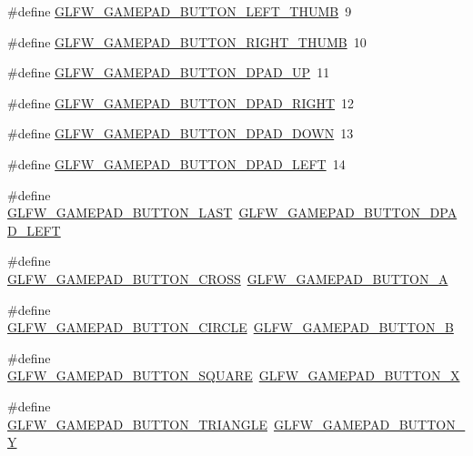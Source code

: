 \begin{DoxyCompactItemize}
\item 
\#define \mbox{\hyperlink{group__gamepad__buttons_ga3e089787327454f7bfca7364d6ca206a}{G\+L\+F\+W\+\_\+\+G\+A\+M\+E\+P\+A\+D\+\_\+\+B\+U\+T\+T\+O\+N\+\_\+\+L\+E\+F\+T\+\_\+\+T\+H\+U\+MB}}~9
\item 
\#define \mbox{\hyperlink{group__gamepad__buttons_ga1c003f52b5aebb45272475b48953b21a}{G\+L\+F\+W\+\_\+\+G\+A\+M\+E\+P\+A\+D\+\_\+\+B\+U\+T\+T\+O\+N\+\_\+\+R\+I\+G\+H\+T\+\_\+\+T\+H\+U\+MB}}~10
\item 
\#define \mbox{\hyperlink{group__gamepad__buttons_ga4f1ed6f974a47bc8930d4874a283476a}{G\+L\+F\+W\+\_\+\+G\+A\+M\+E\+P\+A\+D\+\_\+\+B\+U\+T\+T\+O\+N\+\_\+\+D\+P\+A\+D\+\_\+\+UP}}~11
\item 
\#define \mbox{\hyperlink{group__gamepad__buttons_gae2a780d2a8c79e0b77c0b7b601ca57c6}{G\+L\+F\+W\+\_\+\+G\+A\+M\+E\+P\+A\+D\+\_\+\+B\+U\+T\+T\+O\+N\+\_\+\+D\+P\+A\+D\+\_\+\+R\+I\+G\+HT}}~12
\item 
\#define \mbox{\hyperlink{group__gamepad__buttons_ga8f2b731b97d80f90f11967a83207665c}{G\+L\+F\+W\+\_\+\+G\+A\+M\+E\+P\+A\+D\+\_\+\+B\+U\+T\+T\+O\+N\+\_\+\+D\+P\+A\+D\+\_\+\+D\+O\+WN}}~13
\item 
\#define \mbox{\hyperlink{group__gamepad__buttons_gaf0697e0e8607b2ebe1c93b0c6befe301}{G\+L\+F\+W\+\_\+\+G\+A\+M\+E\+P\+A\+D\+\_\+\+B\+U\+T\+T\+O\+N\+\_\+\+D\+P\+A\+D\+\_\+\+L\+E\+FT}}~14
\item 
\#define \mbox{\hyperlink{group__gamepad__buttons_ga5cc98882f4f81dacf761639a567f61eb}{G\+L\+F\+W\+\_\+\+G\+A\+M\+E\+P\+A\+D\+\_\+\+B\+U\+T\+T\+O\+N\+\_\+\+L\+A\+ST}}~\mbox{\hyperlink{group__gamepad__buttons_gaf0697e0e8607b2ebe1c93b0c6befe301}{G\+L\+F\+W\+\_\+\+G\+A\+M\+E\+P\+A\+D\+\_\+\+B\+U\+T\+T\+O\+N\+\_\+\+D\+P\+A\+D\+\_\+\+L\+E\+FT}}
\item 
\#define \mbox{\hyperlink{group__gamepad__buttons_gaf08d0df26527c9305253422bd98ed63a}{G\+L\+F\+W\+\_\+\+G\+A\+M\+E\+P\+A\+D\+\_\+\+B\+U\+T\+T\+O\+N\+\_\+\+C\+R\+O\+SS}}~\mbox{\hyperlink{group__gamepad__buttons_gae055a12fbf4b48b5954c8e1cd129b810}{G\+L\+F\+W\+\_\+\+G\+A\+M\+E\+P\+A\+D\+\_\+\+B\+U\+T\+T\+O\+N\+\_\+A}}
\item 
\#define \mbox{\hyperlink{group__gamepad__buttons_gaaef094b3dacbf15f272b274516839b82}{G\+L\+F\+W\+\_\+\+G\+A\+M\+E\+P\+A\+D\+\_\+\+B\+U\+T\+T\+O\+N\+\_\+\+C\+I\+R\+C\+LE}}~\mbox{\hyperlink{group__gamepad__buttons_ga2228a6512fd5950cdb51ba07846546fa}{G\+L\+F\+W\+\_\+\+G\+A\+M\+E\+P\+A\+D\+\_\+\+B\+U\+T\+T\+O\+N\+\_\+B}}
\item 
\#define \mbox{\hyperlink{group__gamepad__buttons_gafc7821e87d77d41ed2cd3e1f726ec35f}{G\+L\+F\+W\+\_\+\+G\+A\+M\+E\+P\+A\+D\+\_\+\+B\+U\+T\+T\+O\+N\+\_\+\+S\+Q\+U\+A\+RE}}~\mbox{\hyperlink{group__gamepad__buttons_ga52cc94785cf3fe9a12e246539259887c}{G\+L\+F\+W\+\_\+\+G\+A\+M\+E\+P\+A\+D\+\_\+\+B\+U\+T\+T\+O\+N\+\_\+X}}
\item 
\#define \mbox{\hyperlink{group__gamepad__buttons_ga3a7ef6bcb768a08cd3bf142f7f09f802}{G\+L\+F\+W\+\_\+\+G\+A\+M\+E\+P\+A\+D\+\_\+\+B\+U\+T\+T\+O\+N\+\_\+\+T\+R\+I\+A\+N\+G\+LE}}~\mbox{\hyperlink{group__gamepad__buttons_gafc931248bda494b530cbe057f386a5ed}{G\+L\+F\+W\+\_\+\+G\+A\+M\+E\+P\+A\+D\+\_\+\+B\+U\+T\+T\+O\+N\+\_\+Y}}
\end{DoxyCompactItemize}
